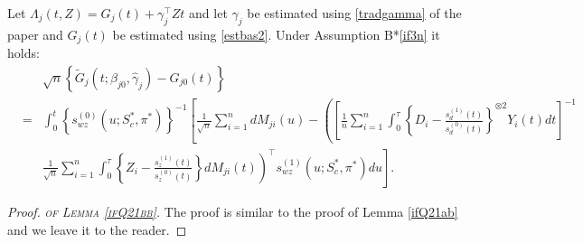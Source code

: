 \documentclass[11pt]{article}
\newcommand{\eqnn}{\begin{eqnarray*}}
\newcommand{\een}{\end{eqnarray*}}
\begin{document}
\begin{lemmas}\label{ifQ21bb}
Let $\Lambda_j(t,Z)=G_j(t) + \gamma_j^{\top} Z t$ and let  $ \gamma_j$ be estimated using \eqref{tradgamma} of the paper and $G_j(t)$ be estimated using \eqref{estbas2}.
Under Assumption B*\ref{if3n} it holds:
\eqnn
&&\sqrt{n}\left\{\tilde G_j(t ; \beta_{j0}, \hat \gamma_j)-G_{j0}(t)\right\}\\&=&\int_0^t\left\{s_{wz}^{(0)}(u; S^{*}_c,\pi^{*})\right\}^{-1}\left[\frac{1}{\sqrt{n}}\sum_{i=1}^ndM_{ji}(u)-\left(\left[\frac{1}{n}\sum_{i=1}^n\int_0^{\tau}\left\{D_i-\frac{s_d^{(1)}(t)}{s_d^{(0)}(t)}\right\}^{\otimes 2}Y_i(t)dt\right]^{-1}\right.\right.\nonumber
\\&&\left.\left.\frac{1}{\sqrt{n}}\sum_{i=1}^n \int_0^\tau \left\{Z_i-\frac{s_z^{(1)}(t)}{s_z^{(0)}(t)}\right\}dM_{ji}(t)\right)^\top s_{wz}^{(1)}(u; S^{*}_c,\pi^{*})du\right].\nonumber
\een
\end{lemmas}
\newenvironment{newproof17}{\begin{proof}\textsc{\emph{of Lemma \ref{ifQ21bb}.}}}{\end{proof}}

\begin{newproof17}
The proof is similar to the proof of Lemma \ref{ifQ21ab} and we leave it to the reader.
\end{newproof17}




\newpage
%
%





\end{document}
